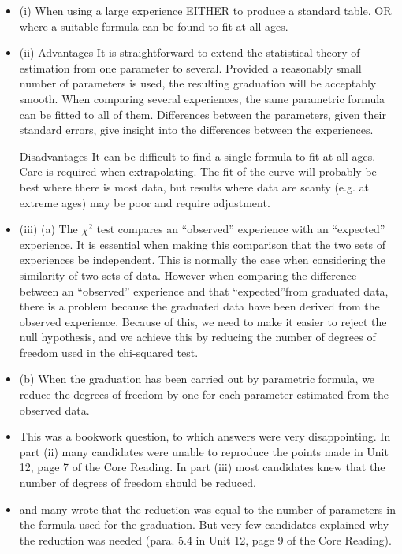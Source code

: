 \documentclass[a4paper,12pt]{article}
\begin{document}
\begin{itemize}
\item (i)
When using a large experience
EITHER to produce a standard table.
OR where a suitable formula can be found to fit at all ages.
\item (ii)
Advantages
It is straightforward to extend the statistical theory of estimation from one parameter to several.
Provided a reasonably small number of parameters is used, the resulting graduation will be acceptably smooth.
When comparing several experiences, the same parametric formula can be fitted to all of them. Differences between the parameters, given their standard errors, give insight into the differences between the experiences.

Disadvantages
It can be difficult to find a single formula to fit at all ages.
Care is required when extrapolating. The fit of the curve will probably be best where there is most data, but results where data are scanty (e.g. at extreme ages) may be poor and require adjustment.
\item (iii)
(a)
The $\chi^2$ test compares an “observed” experience with an “expected” experience.
It is essential when making this comparison that the two sets of experiences be independent.
This is normally the case when considering the similarity of two sets of data.
However when comparing the difference between an “observed” experience and that “expected”from graduated data, there is a problem
because the graduated data have been derived from the observed experience. Because of this, we need to make it easier to reject the null hypothesis, and we achieve this by reducing the number of degrees of freedom used in the chi-squared test.
\item (b)
When the graduation has been carried out by parametric formula, we reduce the degrees of freedom by one for each
parameter estimated from the observed data.
\item 
This was a bookwork question, to which answers were very disappointing. In part (ii) many
candidates were unable to reproduce the points made in Unit 12, page 7 of the Core Reading.
In part (iii) most candidates knew that the number of degrees of freedom should be reduced,
\item 
and many wrote that the reduction was equal to the number of parameters in the formula used for the graduation. But very few candidates explained why the reduction was needed (para. 5.4 in Unit 12, page 9 of the Core Reading).
\end{itemize}
\end{document}
